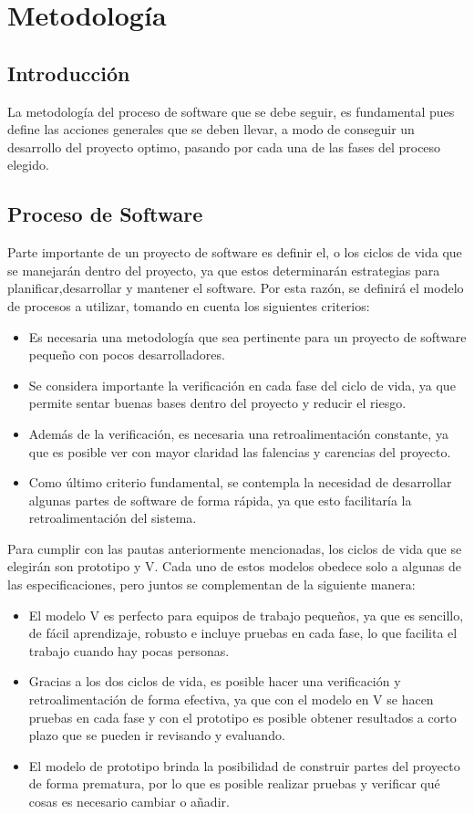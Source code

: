 \chapter{Metodología}
\section{Introducción}
La metodología del proceso de software que se debe seguir, es fundamental pues define las acciones generales que se deben llevar, a modo de conseguir un desarrollo del proyecto optimo, pasando por cada una de las fases del proceso elegido.

\section{Proceso de Software}
Parte importante de un proyecto de software es definir el, o los ciclos de vida que se manejarán dentro del proyecto, ya que estos determinarán estrategias para planificar,desarrollar y mantener el software. Por esta razón, se definirá el modelo de procesos a utilizar, tomando en cuenta los siguientes criterios:
\begin{itemize}
	\item Es necesaria una metodología que sea pertinente para un proyecto de software pequeño con pocos desarrolladores.
	\item Se considera importante la verificación en cada fase del ciclo de vida, ya que permite sentar buenas bases dentro del proyecto y reducir el riesgo.
	\item Además de la verificación, es necesaria una retroalimentación constante, ya que es posible ver con mayor claridad las falencias y carencias del proyecto.
	\item Como último criterio fundamental, se contempla la necesidad de desarrollar algunas partes de software de forma rápida, ya que esto facilitaría la retroalimentación del sistema.
\end{itemize}
Para cumplir con las pautas anteriormente mencionadas, los ciclos de vida que se elegirán son prototipo y V. Cada uno de estos modelos obedece solo a algunas de las especificaciones, pero juntos se complementan de la siguiente manera:
\begin{itemize}
	\item El modelo V es perfecto para equipos de trabajo pequeños, ya que es sencillo, de fácil aprendizaje, robusto e incluye pruebas en cada fase, lo que facilita el trabajo cuando hay pocas personas. 
	\item Gracias a los dos ciclos de vida, es posible hacer una verificación y retroalimentación de forma efectiva, ya que con el modelo en V se hacen pruebas en cada fase y con el prototipo es posible obtener resultados a corto plazo que se pueden ir revisando y evaluando.
	\item El modelo de prototipo brinda la posibilidad de construir partes del proyecto de forma prematura, por lo que es posible realizar pruebas y verificar qué cosas es necesario cambiar o añadir.
\end{itemize}
